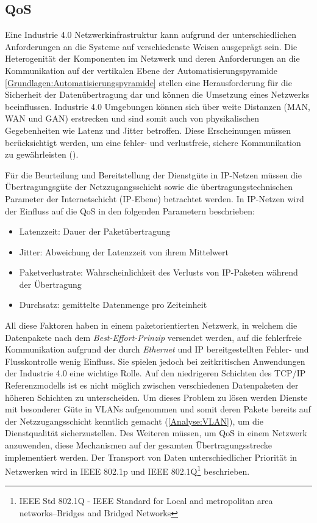 \subsection{\ac{QoS}}
Eine Industrie 4.0 Netzwerkinfrastruktur kann aufgrund der unterschiedlichen Anforderungen an die Systeme auf verschiedenste Weisen ausgeprägt sein. Die Heterogenität der Komponenten im Netzwerk und deren Anforderungen an die Kommunikation auf der vertikalen Ebene der Automatisierungspyramide \autoref{Grundlagen:Automatisierungspyramide} stellen eine Herausforderung für die Sicherheit der Datenübertragung dar und können die Umsetzung eines Netzwerks beeinflussen. Industrie 4.0 Umgebungen können sich über weite Distanzen (\ac{MAN}, \ac{WAN} und \ac{GAN}) erstrecken und sind somit auch von physikalischen Gegebenheiten wie Latenz und Jitter betroffen. Diese Erscheinungen müssen berücksichtigt werden, um eine fehler- und verlustfreie, sichere Kommunikation zu gewährleisten (\cite{torscht2014}).

Für die Beurteilung und Bereitstellung der Dienstgüte in \ac{IP}-Netzen müssen die Übertragungsgüte der Netzzugangsschicht sowie die übertragungstechnischen Parameter der Internetschicht (\ac{IP}-Ebene) betrachtet werden. In IP-Netzen wird der Einfluss auf die \ac{QoS} in den folgenden Parametern beschrieben:

\begin{itemize}
    \item Latenzzeit: Dauer der Paketübertragung
    \item Jitter: Abweichung der Latenzzeit von ihrem Mittelwert
    \item Paketverlustrate: Wahrscheinlichkeit des Verlusts von IP-Paketen während der Übertragung
    \item Durchsatz: gemittelte Datenmenge pro Zeiteinheit
\end{itemize}

All diese Faktoren haben in einem paketorientierten Netzwerk, in welchem die Datenpakete nach dem \textit{Best-Effort-Prinzip} versendet werden, auf die fehlerfreie Kommunikation aufgrund der durch \textit{Ethernet} und \ac{IP} bereitgestellten Fehler- und Flusskontrolle wenig Einfluss. Sie spielen jedoch bei zeitkritischen Anwendungen der Industrie 4.0 eine wichtige Rolle. Auf den niedrigeren Schichten des \ac{TCP}/\ac{IP} Referenzmodells ist es nicht möglich zwischen verschiedenen Datenpaketen der höheren Schichten zu unterscheiden. Um dieses Problem zu lösen werden Dienste mit besonderer Güte in \ac{VLAN}s aufgenommen und somit deren Pakete bereits auf der Netzzugangsschicht kenntlich gemacht (\autoref{Analyse:VLAN}), um die Dienstqualität sicherzustellen. Des Weiteren müssen, um \ac{QoS} in einem Netzwerk anzuwenden, diese Mechanismen auf der gesamten Übertragungsstrecke implementiert werden. Der Transport von Daten unterschiedlicher Priorität in Netzwerken wird in \ac{IEEE} 802.1p und \ac{IEEE} 802.1Q\footnote{IEEE Std 802.1Q - IEEE Standard for Local and metropolitan area networks--Bridges and Bridged Networks} beschrieben.

